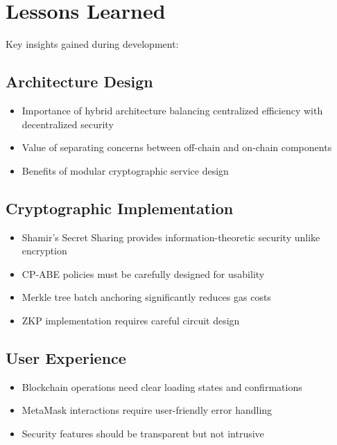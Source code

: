 \section{Lessons Learned}

Key insights gained during development:

\subsection{Architecture Design}

\begin{itemize}
    \item Importance of hybrid architecture balancing centralized efficiency with decentralized security
    \item Value of separating concerns between off-chain and on-chain components
    \item Benefits of modular cryptographic service design
\end{itemize}

\subsection{Cryptographic Implementation}

\begin{itemize}
    \item Shamir's Secret Sharing provides information-theoretic security unlike encryption
    \item CP-ABE policies must be carefully designed for usability
    \item Merkle tree batch anchoring significantly reduces gas costs
    \item ZKP implementation requires careful circuit design
\end{itemize}

\subsection{User Experience}

\begin{itemize}
    \item Blockchain operations need clear loading states and confirmations
    \item MetaMask interactions require user-friendly error handling
    \item Security features should be transparent but not intrusive
\end{itemize}

